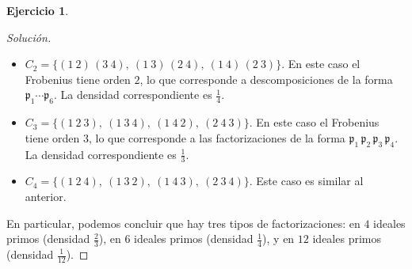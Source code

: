 \documentclass{article}
\newcounter{tarea}
\theoremstyle{definition}
\newtheorem{ejercicio}{Ejercicio}[tarea]
\newenvironment{solucion}{\begin{proof}[Solución]}{\end{proof}}
\begin{document}
\begin{ejercicio}
\begin{solucion}
\begin{itemize}
    \item $C_2 = \{ (1~2)\,(3~4), ~ (1~3)\,(2~4), ~ (1~4)\,(2~3) \}$. En este caso
      el Frobenius tiene orden $2$, lo que corresponde a descomposiciones de la
      forma $\mathfrak{p}_1\cdots\mathfrak{p}_6$. La densidad correspondiente es
      $\frac{1}{4}$.

    \item $C_3 = \{ (1~2~3), ~ (1~3~4), ~ (1~4~2), ~ (2~4~3) \}$. En este caso el
      Frobenius tiene orden $3$, lo que corresponde a las factorizaciones de la
      forma $\mathfrak{p}_1\,\mathfrak{p}_2\,\mathfrak{p}_3\,\mathfrak{p}_4$. La
      densidad correspondiente es $\frac{1}{3}$.

    \item $C_4 = \{ (1~2~4), ~ (1~3~2), ~ (1~4~3), ~ (2~3~4) \}$. Este caso es
      similar al anterior.
    \end{itemize}

    En particular, podemos concluir que hay tres tipos de factorizaciones: en
    $4$ ideales primos (densidad $\frac{2}{3}$), en $6$ ideales primos (densidad
    $\frac{1}{4}$), y en $12$ ideales primos (densidad $\frac{1}{12}$).
  \end{solucion}
  \fi
\end{ejercicio}
\end{document}
